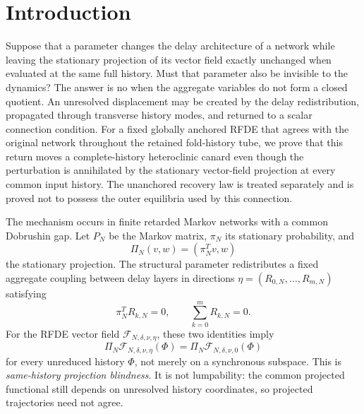 \section{Introduction}
\label{sec:introduction}

Suppose that a parameter changes the delay architecture of a network while
leaving the stationary projection of its vector field exactly unchanged when
evaluated at the same full history.  Must that parameter also be invisible to
the dynamics?  The answer
is no when the aggregate variables do not form a closed quotient.  An
unresolved displacement may be created by the delay redistribution, propagated
through transverse history modes, and returned to a scalar connection
condition.  For a fixed globally anchored RFDE that agrees with the original
network throughout the retained fold-history tube, we prove that this return
moves a complete-history heteroclinic canard even though the perturbation is
annihilated by the stationary vector-field projection at every common input
history.  The unanchored recovery law is treated separately and is proved not
to possess the outer equilibria used by this connection.

The mechanism occurs in finite retarded Markov networks with a common
Dobrushin gap.  Let \(P_N\) be the Markov matrix, \(\pi_N\) its stationary
probability, and
\[
 \Pi_N(v,w)=(\pi_N^Tv,w)
\]
the stationary projection.  The structural parameter redistributes a fixed
aggregate coupling between delay layers in directions
\(\eta=(R_{0,N},\ldots,R_{m,N})\) satisfying
\begin{equation}
 \pi_N^TR_{k,N}=0,
 \qquad \sum_{k=0}^mR_{k,N}=0.                     \label{eq:intro-blind-directions}
\end{equation}
For the RFDE vector field \(\mathcal F_{N,\delta,\nu,\eta}\), these two
identities imply
\begin{equation}
 \Pi_N\mathcal F_{N,\delta,\nu,\eta}(\Phi)
 =\Pi_N\mathcal F_{N,\delta,\nu,0}(\Phi)           \label{eq:intro-blindness}
\end{equation}
for every unreduced history \(\Phi\), not merely on a synchronous subspace.
This is \emph{same-history projection blindness}.  It is not lumpability:
the common projected functional still depends on unresolved history
coordinates, so projected trajectories need not agree.

